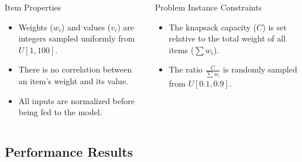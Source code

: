 \begin{frame}
    \begin{columns}[T]
        \begin{column}{0.5\textwidth}
            \begin{alertblock}{Item Properties}
                \begin{itemize}
                    \item Weights ($w_i$) and values ($v_i$) are integers sampled uniformly from $U[1, 100]$.
                    \item There is no correlation between an item's weight and its value.
                    \item All inputs are normalized before being fed to the model.
                \end{itemize}
            \end{alertblock}
        \end{column}
        \begin{column}{0.5\textwidth}
            \begin{alertblock}{Problem Instance Constraints}
                \begin{itemize}
                    \item The knapsack capacity ($C$) is set relative to the total weight of all items ($\sum w_i$).
                    \item The ratio $\frac{C}{\sum w_i}$ is randomly sampled from $U[0.1, 0.9]$.
                \end{itemize}
            \end{alertblock}
        \end{column}
    \end{columns}
    
\end{frame}

\subsection{Performance Results}

